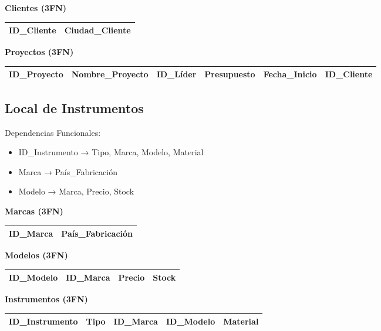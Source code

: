 \documentclass[12pt]{article}
\begin{document}
\textbf{Clientes (3FN)}
\begin{center}
\begin{tabular}{|l|l|}
\hline
ID\_Cliente & Ciudad\_Cliente \\
\hline
\end{tabular}
\end{center}

\textbf{Proyectos (3FN)}
\begin{center}
\begin{tabular}{|l|l|l|l|l|l|}
\hline
ID\_Proyecto & Nombre\_Proyecto & ID\_Líder & Presupuesto & Fecha\_Inicio & ID\_Cliente \\
\hline
\end{tabular}
\end{center}

\subsection{Local de Instrumentos}

Dependencias Funcionales:
\begin{itemize}
    \item ID\_Instrumento → Tipo, Marca, Modelo, Material
    \item Marca → País\_Fabricación
    \item Modelo → Marca, Precio, Stock
\end{itemize}

\textbf{Marcas (3FN)}
\begin{center}
\begin{tabular}{|l|l|}
\hline
ID\_Marca & País\_Fabricación \\
\hline
\end{tabular}
\end{center}

\textbf{Modelos (3FN)}
\begin{center}
\begin{tabular}{|l|l|l|l|}
\hline
ID\_Modelo & ID\_Marca & Precio & Stock \\
\hline
\end{tabular}
\end{center}

\textbf{Instrumentos (3FN)}
\begin{center}
\begin{tabular}{|l|l|l|l|l|}
\hline
ID\_Instrumento & Tipo & ID\_Marca & ID\_Modelo & Material \\
\hline
\end{tabular}
\end{center}
\end{document}
